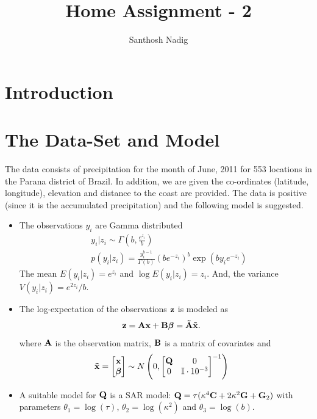 \documentclass[a4paper,10pt]{article}
\title{Home Assignment - 2}
\author{Santhosh Nadig}
\def\bA{{\bf A}}
\def\bB{{\bf B}}
\def\bG{{\bf G}}
\def\bQ{{\bf Q}}
\def\bC{{\bf C}}
\def\btA{{\bf \tilde A}}
\def\bx{{\bf x}}
\def\bz{{\bf z}}
\def\btx{{\bf{\tilde x}}}
\def\bbeta{{\boldsymbol \beta}}
\begin{document}
\maketitle

\section{Introduction}


\section{The Data-Set and Model}
\label{sec:model}
The data consists of precipitation for the month of June, 2011 for 553 locations in the Parana district of Brazil. In addition, we are given the co-ordinates (latitude, longitude), elevation and distance to the coast are provided. The data is positive (since it is the accumulated precipitation) and the following model is suggested.

\begin{itemize}
 \item The observations $y_i$ are Gamma distributed
 \begin{align*}
  & y_i|z_i \sim \Gamma \left( b , \frac{e^{z_i}}{b}\right) \\
  & p(y_i|z_i) = \frac{y_i^{b-1}}{\Gamma(b)} \left( b e^{-z_i} \right)^b \exp(b y_i e^{-z_i})
 \end{align*}
 The mean $E(y_i|z_i) = e^{z_i}$ and $\log E(y_i|z_i) = z_i$. And, the variance $V(y_i|z_i) = e^{2z_i}/b$.
 
 \item The log-expectation of the observations $\bz$ is modeled as 
 \begin{align*}
  & \bz = \bA \bx + \bB \bbeta = \btA \btx.
 \end{align*}
 where $\bA$ is the observation matrix, $\bB$ is a matrix of covariates and
 \begin{align*}
  &\btx = \begin{bmatrix}
          \bx \\
          \bbeta
         \end{bmatrix} \sim
         N\left( 0, \begin{bmatrix}
                     \bQ & 0 \\
                     0 & \mathbb{I} \cdot 10^{-3}
                    \end{bmatrix}^{-1}
 \right)
 \end{align*}
 \item A suitable model for $\bQ$ is a SAR model: $\bQ = \tau (\kappa^4 \bC + 2\kappa^2 \bG + \bG_2)$ with parameters $\theta_1 = \log (\tau)$,  $\theta_2 = \log (\kappa^2)$  and $\theta_3 = \log(b)$.
\end{itemize}
\end{document}

